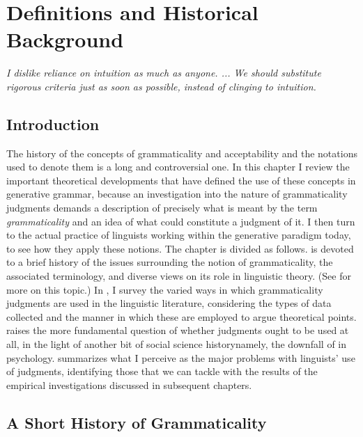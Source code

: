 \chapter{Definitions and Historical Background}\label{sec:2}

\epigraph{\textit{I dislike reliance on intuition as much as anyone. ... We should substitute rigorous criteria just as soon as possible, instead of clinging to intuition.\\[-2\baselineskip]}}{\citep{Chomsky1962}}

\section{Introduction} \label{sec:2.1}

The history of the concepts of grammaticality and acceptability and the notations used to denote them is a long and controversial one. In this chapter I review the important theoretical developments that have defined the use of these concepts in generative grammar, because an investigation into the nature of grammaticality judgments demands a description of precisely what is meant by the term \textit{grammaticality} and an idea of what could constitute a judgment of it. I then turn to the actual practice of linguists working within the generative paradigm today, to see how they apply these notions. The chapter is divided as follows.  is devoted to a brief history of the issues surrounding the notion of grammaticality, the associated terminology, and diverse views on its role in linguistic theory. (See \citet[ch. 7]{Harris1993} for more on this topic.) In , I survey the varied ways in which grammaticality judgments are used in the linguistic literature, considering the types of data collected and the manner in which these are employed to argue theoretical points.  raises the more fundamental question of whether judgments ought to be used at all, in the light of another bit of social science history\schdash{}namely, the downfall of  in psychology.  summarizes what I perceive as the major problems with linguists' use of judgments, identifying those that we can tackle with the results of the empirical investigations discussed in subsequent chapters.

\section{A Short History of Grammaticality} \label{sec:2.2}

